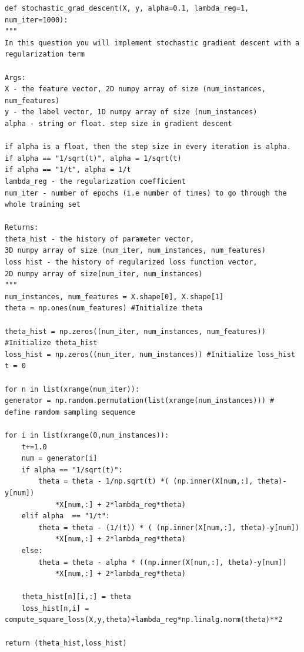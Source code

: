 \documentclass{article}
\newenvironment{sub}[2][$-$]{\begin{trivlist}
		\item[\hskip \labelsep {\bfseries #1}\hskip \labelsep {\bfseries #2.}]}  {\end{trivlist}}
\begin{document}
\begin{verbatim}
def stochastic_grad_descent(X, y, alpha=0.1, lambda_reg=1, num_iter=1000):
"""
In this question you will implement stochastic gradient descent with a regularization term

Args:
X - the feature vector, 2D numpy array of size (num_instances, num_features)
y - the label vector, 1D numpy array of size (num_instances)
alpha - string or float. step size in gradient descent

if alpha is a float, then the step size in every iteration is alpha.
if alpha == "1/sqrt(t)", alpha = 1/sqrt(t)
if alpha == "1/t", alpha = 1/t
lambda_reg - the regularization coefficient
num_iter - number of epochs (i.e number of times) to go through the whole training set

Returns:
theta_hist - the history of parameter vector, 
3D numpy array of size (num_iter, num_instances, num_features) 
loss hist - the history of regularized loss function vector, 
2D numpy array of size(num_iter, num_instances)
"""
num_instances, num_features = X.shape[0], X.shape[1]
theta = np.ones(num_features) #Initialize theta

theta_hist = np.zeros((num_iter, num_instances, num_features))  #Initialize theta_hist
loss_hist = np.zeros((num_iter, num_instances)) #Initialize loss_hist
t = 0

for n in list(xrange(num_iter)):
generator = np.random.permutation(list(xrange(num_instances))) # define ramdom sampling sequence

for i in list(xrange(0,num_instances)):
	t+=1.0
	num = generator[i]
	if alpha == "1/sqrt(t)":
		theta = theta - 1/np.sqrt(t) *( (np.inner(X[num,:], theta)-y[num]) 
			*X[num,:] + 2*lambda_reg*theta)
	elif alpha  == "1/t":
		theta = theta - (1/(t)) * ( (np.inner(X[num,:], theta)-y[num]) 
			*X[num,:] + 2*lambda_reg*theta)
	else:
		theta = theta - alpha * ((np.inner(X[num,:], theta)-y[num]) 
			*X[num,:] + 2*lambda_reg*theta)
	
	theta_hist[n][i,:] = theta 
	loss_hist[n,i] = compute_square_loss(X,y,theta)+lambda_reg*np.linalg.norm(theta)**2

return (theta_hist,loss_hist)    

\end{verbatim}

\begin{sub}{2.6.3}
\end{sub}
\end{document}
